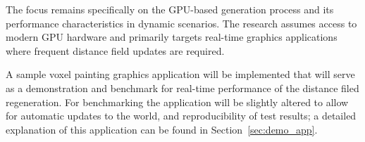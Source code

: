 The focus remains specifically on the GPU-based generation process and its performance characteristics in dynamic
scenarios. The research assumes access to modern GPU hardware and primarily targets real-time graphics applications
where frequent distance field updates are required.

A sample voxel painting graphics application will be implemented that will serve as a demonstration and benchmark for
real-time performance of the distance filed regeneration. For benchmarking the application will be slightly altered to
allow for automatic updates to the world, and reproducibility of test results; a detailed explanation of this
application can be found in Section~\ref{sec:demo_app}.
